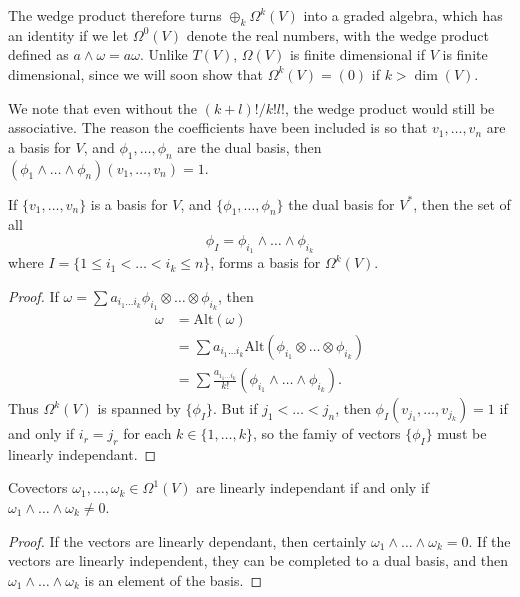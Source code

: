 The wedge product therefore turns $\oplus_k \Omega^k(V)$ into a graded algebra, which has an identity if we let $\Omega^0(V)$ denote the real numbers, with the wedge product defined as $a \wedge \omega = a \omega$. Unlike $T(V)$, $\Omega(V)$ is finite dimensional if $V$ is finite dimensional, since we will soon show that $\Omega^k(V) = (0)$ if $k > \dim(V)$.

\begin{remark}
    We note that even without the $(k+l)! / k! l!$, the wedge product would still be associative. The reason the coefficients have been included is so that $v_1, \dots, v_n$ are a basis for $V$, and $\phi_1, \dots, \phi_n$ are the dual basis, then $(\phi_1 \wedge \dots \wedge \phi_n)(v_1, \dots, v_n) = 1$.
\end{remark}

\begin{theorem}
    If $\{ v_1, \dots, v_n \}$ is a basis for $V$, and $\{ \phi_1, \dots, \phi_n \}$ the dual basis for $V^*$, then the set of all
    \[ \phi_I = \phi_{i_1} \wedge \dots \wedge \phi_{i_k} \]
    where $I = \{ 1 \leq i_1 < \dots < i_k \leq n \}$, forms a basis for $\Omega^k(V)$.
\end{theorem}
\begin{proof}
    If $\omega = \sum a_{i_1 \dots i_k} \phi_{i_1} \otimes \dots \otimes \phi_{i_k}$, then
    \begin{align*}
        \omega &= \text{Alt}(\omega)\\
        &= \sum a_{i_1 \dots i_k} \text{Alt}(\phi_{i_1} \otimes \dots \otimes \phi_{i_k})\\
        &= \sum \frac{a_{i_1 \dots i_k}}{k!} (\phi_{i_1} \wedge \dots \wedge \phi_{i_k}).
    \end{align*}
    Thus $\Omega^k(V)$ is spanned by $\{ \phi_I \}$. But if $j_1 < \dots < j_n$, then $\phi_I(v_{j_1}, \dots, v_{j_k}) = 1$ if and only if $i_r = j_r$ for each $k \in \{ 1, \dots, k \}$, so the famiy of vectors $\{ \phi_I \}$ must be linearly independant.
\end{proof}

\begin{corollary}
    Covectors $\omega_1, \dots, \omega_k \in \Omega^1(V)$ are linearly independant if and only if $\omega_1 \wedge \dots \wedge \omega_k \neq 0$.
\end{corollary}
\begin{proof}
    If the vectors are linearly dependant, then certainly $\omega_1 \wedge \dots \wedge \omega_k = 0$. If the vectors are linearly independent, they can be completed to a dual basis, and then $\omega_1 \wedge \dots \wedge \omega_k$ is an element of the basis.
\end{proof}

